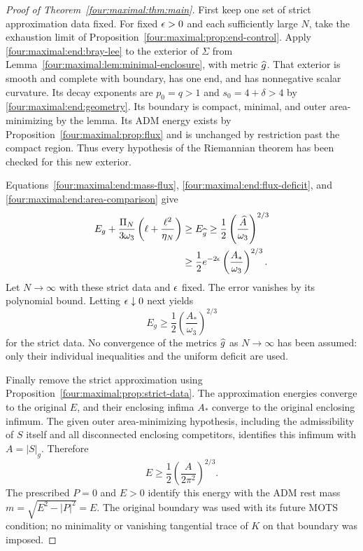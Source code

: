 \begin{proof}[Proof of Theorem~\ref{four:maximal:thm:main}]
First keep one set of strict approximation data fixed.  For fixed
$\epsilon>0$ and each sufficiently large $N$, take the exhaustion limit
of Proposition~\ref{four:maximal:prop:end-control}.  Apply
\eqref{four:maximal:end:bray-lee} to the exterior of $\Sigma$ from
Lemma~\ref{four:maximal:lem:minimal-enclosure}, with metric $\widehat g$.
That exterior is smooth and complete with boundary, has one end,
and has nonnegative scalar curvature.  Its decay exponents are
$p_0=q>1$ and $s_0=4+\delta>4$ by \eqref{four:maximal:end:geometry}.  Its boundary
is compact, minimal, and outer area-minimizing by the lemma.  Its
ADM energy exists by Proposition~\ref{four:maximal:prop:flux} and is unchanged
by restriction past the compact region.  Thus every hypothesis of
the Riemannian theorem has been checked for this new exterior.

Equations~\eqref{four:maximal:end:mass-flux}, \eqref{four:maximal:end:flux-deficit}, and
\eqref{four:maximal:end:area-comparison} give
\begin{align*}
 E_g+\frac{\Pi_N}{3\omega_3}
                  \left(\ell+\frac{\ell^2}{\eta_N}\right)
 &\ge E_{\widehat g}
 \ge\frac12\left(\frac{\widehat A}{\omega_3}\right)^{2/3}\\
 &\ge\frac12e^{-2\epsilon}
                       \left(\frac{A_*}{\omega_3}\right)^{2/3}.
\end{align*}
Let $N\to\infty$ with these strict data and $\epsilon$ fixed.  The error
vanishes by its polynomial bound.  Letting $\epsilon\downarrow0$ next
yields
\[
 E_g\ge\frac12\left(\frac{A_*}{\omega_3}\right)^{2/3}
\]
for the strict data.  No convergence of the metrics $\widehat g$ as
$N\to\infty$ has been assumed: only their individual inequalities
and the uniform deficit are used.

Finally remove the strict approximation using
Proposition~\ref{four:maximal:prop:strict-data}.  The approximation energies
converge to the original $E$, and their enclosing infima $A_*$
converge to the original enclosing infimum.  The given outer
area-minimizing hypothesis, including the admissibility of $S$
itself and all disconnected enclosing competitors, identifies this
infimum with $A=|S|_g$.  Therefore
\[
 \boxed{\displaystyle
 E\ge\frac12\left(\frac{A}{2\pi^2}\right)^{2/3}.}
\]
The prescribed $P=0$ and $E>0$ identify this energy with the ADM rest
mass $m=\sqrt{E^2-|P|^2}=E$.  The original boundary was used with its
future MOTS condition; no minimality or vanishing tangential trace
of $K$ on that boundary was imposed.
\end{proof}
